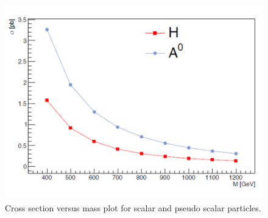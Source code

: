 \documentclass{cmspaper}
\begin{document}
\begin{figure}[htp]
\centering
\includegraphics[scale=0.50]{diagrams/xsec_mass.png}
\caption{Cross section versus mass plot for scalar and pseudo scalar particles.}\label{xsec_mass}
\end{figure}
\end{document}
